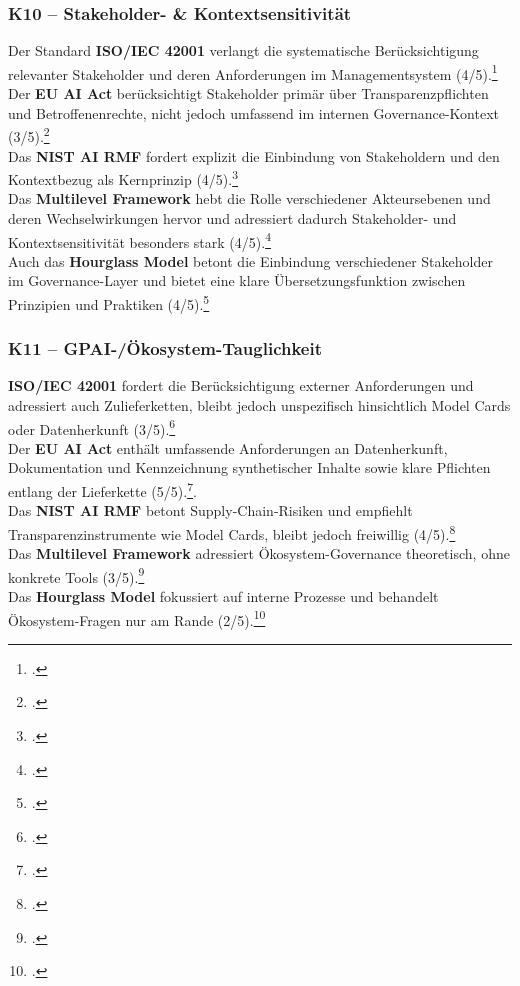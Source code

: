 \subsubsection{K10 – Stakeholder- \& Kontextsensitivität}
Der Standard \textbf{ISO/IEC 42001} verlangt die systematische Berücksichtigung relevanter Stakeholder und deren Anforderungen im Managementsystem (4/5).\footcite[][Kap.~4.2]{isoISOIEC42001}
\\
Der \textbf{EU AI Act} berücksichtigt Stakeholder primär über Transparenzpflichten und Betroffenenrechte, nicht jedoch umfassend im internen Governance-Kontext (3/5).\footcite[][S.~2--5]{europeanparliamentaryresearchserviceArtificialIntelligenceAct2024}
\\
Das \textbf{NIST AI RMF} fordert explizit die Einbindung von Stakeholdern und den Kontextbezug als Kernprinzip (4/5).\footcite[][S.~7--9]{nationalinstituteofstandardsandtechnologyAIRiskManagement2021}
\\
Das \textbf{Multilevel Framework} hebt die Rolle verschiedener Akteursebenen und deren Wechselwirkungen hervor und adressiert dadurch Stakeholder- und Kontextsensitivität besonders stark (4/5).\footcite[][S.~8--11]{choungMultilevelFrameworkAI2023}
\\
Auch das \textbf{Hourglass Model} betont die Einbindung verschiedener Stakeholder im Governance-Layer und bietet eine klare Übersetzungsfunktion zwischen Prinzipien und Praktiken (4/5).\footcite[][S.~4--6]{mantymakiPDFPuttingAI2025}

\subsubsection{K11 – GPAI-/Ökosystem-Tauglichkeit}
\textbf{ISO/IEC 42001} fordert die Berücksichtigung externer Anforderungen und adressiert auch Zulieferketten, bleibt jedoch unspezifisch hinsichtlich Model Cards oder Datenherkunft (3/5).\footcite[][Kap.~4.1, 8.1]{isoISOIEC42001}
\\
Der \textbf{EU AI Act} enthält umfassende Anforderungen an Datenherkunft, Dokumentation und Kennzeichnung synthetischer Inhalte sowie klare Pflichten entlang der Lieferkette (5/5).\footcite[][S.~4--7]{europeanparliamentaryresearchserviceArtificialIntelligenceAct2024}.  
\\
Das \textbf{NIST AI RMF} betont Supply-Chain-Risiken und empfiehlt Transparenzinstrumente wie Model Cards, bleibt jedoch freiwillig (4/5).\footcite[][S.~11--13]{nationalinstituteofstandardsandtechnologyAIRiskManagement2021}  
\\
Das \textbf{Multilevel Framework} adressiert Ökosystem-Governance theoretisch, ohne konkrete Tools (3/5).\footcite[][S.~9--12]{choungMultilevelFrameworkAI2023}
\\
Das \textbf{Hourglass Model} fokussiert auf interne Prozesse und behandelt Ökosystem-Fragen nur am Rande (2/5).\footcite[][S.~5--6]{mantymakiPDFPuttingAI2025}

